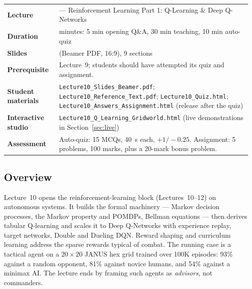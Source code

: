 \documentclass[11pt]{article}
\begin{document}
\begin{center}\small\renewcommand{\arraystretch}{1.25}\begin{tabularx}{\textwidth}{@{}>{\bfseries}p{3.3cm}>{\raggedright\arraybackslash}X@{}}\toprule

\textcolor{NavyN}{Lecture}&10 --- Reinforcement Learning Part 1: Q-Learning \& Deep Q-Networks\\
\textcolor{NavyN}{Duration}&45 minutes: 5 min opening Q\&A, 30 min teaching, 10 min auto-quiz\\
\textcolor{NavyN}{Slides}&19 (Beamer PDF, 16:9), 9 sections\\
\textcolor{NavyN}{Prerequisite}&Lecture~9; students should have attempted its quiz and assignment.\\
\textcolor{NavyN}{Student materials}&\texttt{Lecture10\_Slides\_Beamer.pdf}; \texttt{Lecture10\_Reference\_Text.pdf}; \texttt{Lecture10\_Quiz.html}; \texttt{Lecture10\_Answers\_Assignment.html} (release after the quiz)\\
\textcolor{NavyN}{Interactive studio}&\texttt{Lecture10\_Q\_Learning\_Gridworld.html} (live demonstrations in Section~\ref{sec:live})\\
\textcolor{NavyN}{Assessment}&Auto-quiz: 15 MCQs, 40~s each, $+1/-0.25$. Assignment: 5 problems, 100 marks, plus a 20-mark bonus problem.\\\bottomrule\end{tabularx}\end{center}

\subsection*{Overview}Lecture~10 opens the reinforcement-learning block (Lectures~10--12) on autonomous systems. It builds the formal machinery --- Markov decision processes, the Markov property and POMDPs, Bellman equations --- then derives tabular Q-learning and scales it to Deep Q-Networks with experience replay, target networks, Double and Dueling DQN. Reward shaping and curriculum learning address the sparse rewards typical of combat. The running case is a tactical agent on a $20\times20$ JANUS hex grid trained over 100K episodes: 93\% against a random opponent, 81\% against novice humans, and 54\% against a minimax AI. The lecture ends by framing such agents as \emph{advisors}, not commanders.
\end{document}
